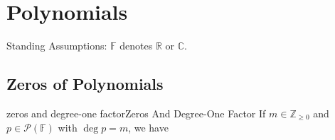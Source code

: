 \documentclass[../main.tex]{subfiles}
\begin{document}
\chapter{Polynomials}

\begin{plainblackenv}
Standing Assumptions:
\tcblower
$\mathbb{F}$ denotes $\mathbb{R}$ or $\mathbb{C}$.
\end{plainblackenv}

\section{Zeros of Polynomials}

\begin{theorem}{zeros and degree-one factor}{Zeros And Degree-One Factor}
If $m\in \mathbb{Z}_{\geq 0}$ and $p\in \mathscr{P}(\mathbb{F})$ with $\deg p=m$, we have 

\end{theorem}
\end{document}
